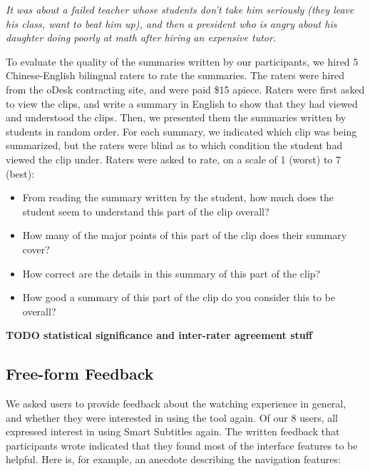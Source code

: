 \documentclass{sigchi}
\begin{document}
\emph{It was about a failed teacher whose students don't take him seriously (they leave his class, want to beat him up), and then a president who is angry about his daughter doing poorly at math after hiring an expensive tutor.}

To evaluate the quality of the summaries written by our participants, we hired 5 Chinese-English bilingual raters to rate the summaries. The raters were hired from the oDesk contracting site, and were paid \$15 apiece. Raters were
first asked to view the clips, and write a summary in English to show that they had viewed and understood the clips.
Then, we presented them the summaries
written by students in random order. For each summary, we indicated which clip was being summarized, but the raters were blind as to which condition the student had viewed the clip under. Raters were asked to rate, on a scale of 1 (worst) to 7 (best):

\begin{itemize}[noitemsep]
\item From reading the summary written by the student, how much does the student seem to understand this part of the clip overall? %
\item How many of the major points of this part of the clip does their summary cover? %
\item How correct are the details in this summary of this part of the clip? %
\item How good a summary of this part of the clip do you consider this to be overall? %
\end{itemize}

\textbf{TODO statistical significance and inter-rater agreement stuff}

\subsection{Free-form Feedback}

We asked users to provide feedback about the watching experience in general, and whether they were interested in using the tool again. Of our 8 users, all expressed interest in using Smart Subtitles again. The written feedback that participants wrote indicated that they found most of the interface features to be helpful. Here is, for example, an anecdote describing the navigation features:
	 	 	
\end{document}
